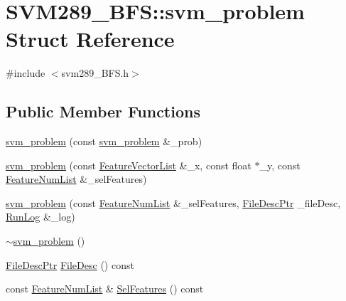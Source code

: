 \hypertarget{struct_s_v_m289___b_f_s_1_1svm__problem}{}\section{S\+V\+M289\+\_\+\+B\+FS\+:\+:svm\+\_\+problem Struct Reference}
\label{struct_s_v_m289___b_f_s_1_1svm__problem}


{\ttfamily \#include $<$svm289\+\_\+\+B\+F\+S.\+h$>$}

\subsection*{Public Member Functions}
\begin{DoxyCompactItemize}
\item 
\hyperlink{struct_s_v_m289___b_f_s_1_1svm__problem_ae0bbccbf89042fa0850d3e9f855c8509}{svm\+\_\+problem} (const \hyperlink{struct_s_v_m289___b_f_s_1_1svm__problem}{svm\+\_\+problem} \&\+\_\+prob)
\item 
\hyperlink{struct_s_v_m289___b_f_s_1_1svm__problem_acae25a973552d6d8d76278c93aa238c9}{svm\+\_\+problem} (const \hyperlink{class_k_k_m_l_l_1_1_feature_vector_list}{Feature\+Vector\+List} \&\+\_\+x, const float $\ast$\+\_\+y, const \hyperlink{class_k_k_m_l_l_1_1_feature_num_list}{Feature\+Num\+List} \&\+\_\+sel\+Features)
\item 
\hyperlink{struct_s_v_m289___b_f_s_1_1svm__problem_a9db302553b3219241cf51ba57bf39ee0}{svm\+\_\+problem} (const \hyperlink{class_k_k_m_l_l_1_1_feature_num_list}{Feature\+Num\+List} \&\+\_\+sel\+Features, \hyperlink{namespace_k_k_m_l_l_aa0d0b6ab4ec18868a399b8455b05d914}{File\+Desc\+Ptr} \+\_\+file\+Desc, \hyperlink{class_k_k_b_1_1_run_log}{Run\+Log} \&\+\_\+log)
\item 
\hyperlink{struct_s_v_m289___b_f_s_1_1svm__problem_ab1178d75f24b56118d9de718425d4d79}{$\sim$svm\+\_\+problem} ()
\item 
\hyperlink{namespace_k_k_m_l_l_aa0d0b6ab4ec18868a399b8455b05d914}{File\+Desc\+Ptr} \hyperlink{struct_s_v_m289___b_f_s_1_1svm__problem_a0b0e37f9bfd7753f691070fdcd05569f}{File\+Desc} () const 
\item 
const \hyperlink{class_k_k_m_l_l_1_1_feature_num_list}{Feature\+Num\+List} \& \hyperlink{struct_s_v_m289___b_f_s_1_1svm__problem_a3127cc3a9a6352218c227051f2608caa}{Sel\+Features} () const 
\end{DoxyCompactItemize}
